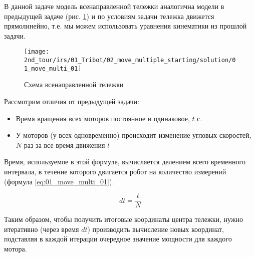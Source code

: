 \solutionSection

В данной задаче модель всенаправленной тележки аналогична модели в предыдущей задаче (рис. \ref{fig:01_move_multi_01}) и по условиям задачи тележка движется прямолинейно, т.е. мы можем использовать уравнения кинематики из прошлой задачи. 

\begin{figure}[h!]
	\centering
	\texttt{[image: 2nd\_tour/irs/01\_Tribot/02\_move\_multiple\_starting/solution/01\_move\_multi\_01]}
	\caption{Схема всенаправленной тележки}
	\label{fig:01_move_multi_01}
\end{figure}

Рассмотрим отличия от предыдущей задачи:
\begin{itemize}
	\item Время вращения всех моторов постоянное и одинаковое, $t$ с.
	\item У моторов (у всех одновременно) происходит изменение угловых скоростей, $N$ раз за все время движения $t$
\end{itemize}

Время, используемое в этой формуле, вычисляется делением всего временного интервала, в течение которого двигается робот на количество измерений (формула \ref{eq:01_move_multi_01}).

\begin{equation}
	dt = \frac{t}{N}
	\label{eq:01_move_multi_01}
\end{equation}

Таким образом, чтобы получить итоговые координаты центра тележки, нужно итеративно (через время $dt$) производить вычисление новых координат, подставляя в каждой итерации очередное значение мощности для каждого мотора.

\codeExample

{}